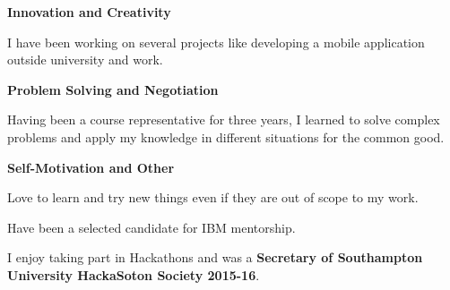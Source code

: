 

\begin{cventries}

	\cventry
	{\textbf{Innovation and Creativity}} %
	{}
	{}
	{}
	{
    \begin{cvitems}
    \item I have been working on several projects like developing a mobile application outside university and work.
	\end{cvitems}
	}


	\cventry
	{\textbf{Problem Solving and Negotiation}} %
	{}
	{}
	{}
	{
	\begin{cvitems}
	\item Having been a course representative for three years, I learned to solve complex problems and apply my knowledge in different situations for the common good.
	\end{cvitems}
	}


	\cventry
	{\textbf{Self-Motivation and Other}} %
	{}
	{}
	{}
	{
    \begin{cvitems} %
    \item{Love to learn and try new things even if they are out of scope to my work.}
    \item {Have been a selected candidate for IBM mentorship.}
    \item {I enjoy taking part in Hackathons and was a \textbf{Secretary of Southampton University HackaSoton Society 2015-16}.}
	\end{cvitems}
	}

	
\end{cventries}
